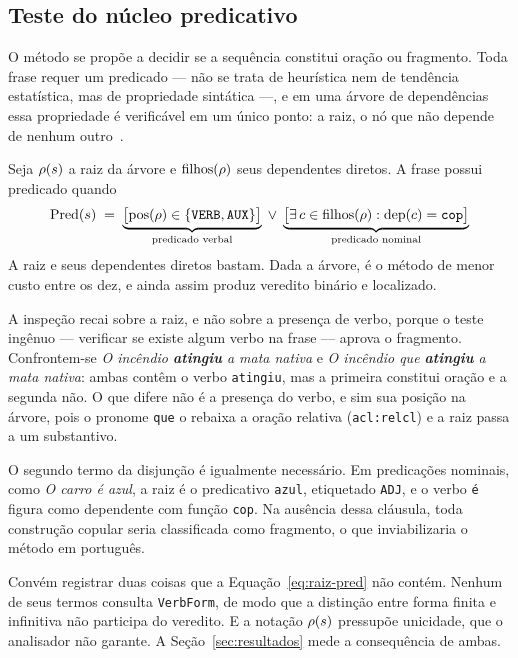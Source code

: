 \subsection{Teste do núcleo predicativo}
\label{met:raiz}

\indent\indent O método se propõe a decidir se a sequência constitui oração ou fragmento. Toda frase requer
um predicado --- não se trata de heurística nem de tendência estatística, mas de propriedade
sintática ---, e em uma árvore de dependências essa propriedade é verificável em um único
ponto: a raiz, o nó que não depende de nenhum outro~\cite{nivre2016}.

Seja $\rho(s)$ a raiz da árvore e $\mathrm{filhos}(\rho)$ seus dependentes diretos. A
frase possui predicado quando
%
\begin{equation}
\mathrm{Pred}(s) \;=\;
\underbrace{\bigl[\mathrm{pos}(\rho) \in \{\texttt{VERB}, \texttt{AUX}\}\bigr]}_{\text{predicado verbal}}
\;\lor\;
\underbrace{\bigl[\exists\, c \in \mathrm{filhos}(\rho) : \mathrm{dep}(c) = \texttt{cop}\bigr]}_{\text{predicado nominal}}
\label{eq:raiz-pred}
\end{equation}
%
A raiz e seus dependentes diretos bastam. Dada a árvore, é o método de menor custo entre os
dez, e ainda assim produz veredito binário e localizado.

A inspeção recai sobre a raiz, e não sobre a presença de verbo, porque o teste ingênuo ---
verificar se existe algum verbo na frase --- aprova o fragmento. Confrontem-se \emph{O incêndio
\textbf{atingiu} a mata nativa} e \emph{O incêndio que \textbf{atingiu} a mata nativa}: ambas
contêm o verbo \texttt{atingiu}, mas a primeira constitui oração e a segunda não. O que difere
não é a presença do verbo, e sim sua posição na árvore, pois o pronome \texttt{que} o rebaixa
a oração relativa (\texttt{acl:relcl}) e a raiz passa a um substantivo.

O segundo termo da disjunção é igualmente necessário. Em predicações nominais, como \emph{O
carro é azul}, a raiz é o predicativo \texttt{azul}, etiquetado \texttt{ADJ}, e o verbo
\texttt{é} figura como dependente com função \texttt{cop}. Na ausência dessa cláusula, toda
construção copular seria classificada como fragmento, o que inviabilizaria o método em
português.

Convém registrar duas coisas que a Equação~\ref{eq:raiz-pred} não contém. Nenhum de seus
termos consulta \texttt{VerbForm}, de modo que a distinção entre forma finita e infinitiva não
participa do veredito. E a notação $\rho(s)$ pressupõe unicidade, que o analisador não
garante. A Seção~\ref{sec:resultados} mede a consequência de ambas.
